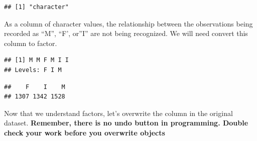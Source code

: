 \documentclass[
]{book}
\newenvironment{Shaded}{\begin{snugshade}}{\end{snugshade}}
\newcommand{\FunctionTok}[1]{\textcolor[rgb]{0.13,0.29,0.53}{\textbf{#1}}}
\newcommand{\NormalTok}[1]{#1}
\newcommand{\OtherTok}[1]{\textcolor[rgb]{0.56,0.35,0.01}{#1}}
\newcommand{\SpecialCharTok}[1]{\textcolor[rgb]{0.81,0.36,0.00}{\textbf{#1}}}
\begin{document}
\begin{Shaded}
\end{Shaded}

\begin{verbatim}
## [1] "character"
\end{verbatim}

\begin{Shaded}
\end{Shaded}

As a column of character values, the relationship between the observations being recorded as ``M'', ``F', or''I'' are not being recognized. We will need convert this column to factor.

\begin{Shaded}
\end{Shaded}

\begin{verbatim}
## [1] M M F M I I
## Levels: F I M
\end{verbatim}

\begin{Shaded}
\end{Shaded}

\begin{verbatim}
##    F    I    M 
## 1307 1342 1528
\end{verbatim}

Now that we understand factors, let's overwrite the column in the original dataset. \textbf{Remember, there is no undo button in programming. Double check your work before you overwrite objects}

\begin{Shaded}
\end{Shaded}
\end{document}
